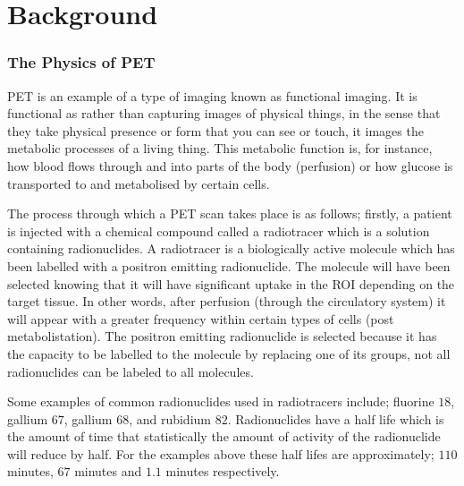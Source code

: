 \chapter{Background} \label{background}
    \blindtext
    
        \blindtext
        
        \subsection{The Physics of PET} \label{the_physics_of_pet}
            \gls{PET} is an example of a type of imaging known as functional imaging. It is functional as rather than capturing images of physical things, in the sense that they take physical presence or form that you can see or touch, it images the metabolic processes of a living thing. This metabolic function is, for instance, how blood flows through and into parts of the body (perfusion) or how glucose is transported to and metabolised by certain cells.
            
            The process through which a \gls{PET} scan takes place is as follows; firstly, a patient is injected with a chemical compound called a radiotracer which is a solution containing radionuclides. A radiotracer is a biologically active molecule which has been labelled with a positron emitting radionuclide. The molecule will have been selected knowing that it will have significant uptake in the \gls{ROI} depending on the target tissue. In other words, after perfusion (through the circulatory system) it will appear with a greater frequency within certain types of cells (post metabolistation). The positron emitting radionuclide is selected because it has the capacity to be labelled to the molecule by replacing one of its groups, not all radionuclides can be labeled to all molecules. %
            
            Some examples of common radionuclides used in radiotracers include; fluorine $18$, gallium $67$, gallium $68$, and rubidium $82$. Radionuclides have a half life which is the amount of time that statistically the amount of activity of the radionuclide will reduce by half. For the examples above these half lifes are approximately; $110$ minutes, $67$ minutes and $1.1$ minutes respectively.
            
